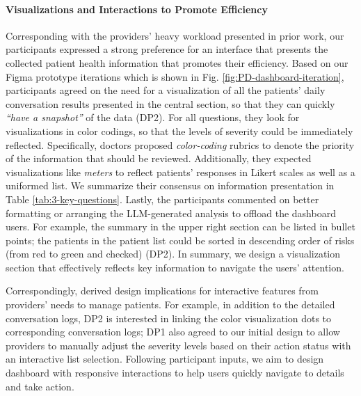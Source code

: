 \paragraph{Visualizations and Interactions to Promote Efficiency}
\label{3-PD-finding-efficiency}
Corresponding with the providers' heavy workload presented in prior work, our participants expressed a strong preference for an interface that presents the collected patient health information that promotes their efficiency. 
Based on our Figma prototype iterations which is shown in Fig. \ref{fig:PD-dashboard-iteration}, participants agreed on the need for a visualization of all the patients' daily conversation results presented in the central section, so that they can quickly \textit{``have a snapshot''} of the data (DP2). For all questions, they look for visualizations in color codings, so that the levels of severity could be immediately reflected. Specifically, doctors proposed \textit{color-coding }rubrics to denote the priority of the information that should be reviewed.
Additionally, they expected visualizations like \textit{meters} to reflect patients' responses in Likert scales as well as a uniformed list.  We summarize their consensus on information presentation in Table \ref{tab:3-key-questions}.
Lastly, the participants commented on better formatting or arranging the LLM-generated analysis to offload the dashboard users. For example, the summary in the upper right section can be listed in bullet points; the patients in the patient list could be sorted in descending order of risks (from red to green and checked) (DP2). In summary, we design a visualization section that effectively reflects key information to navigate the users' attention.

Correspondingly, derived design implications for interactive features from providers' needs to manage patients. For example, in addition to the detailed conversation logs, DP2 is interested in linking the color visualization dots to corresponding conversation logs; DP1 also agreed to our initial design to allow providers to manually adjust the severity levels based on their action status with an interactive list selection.
Following participant inputs, we aim to design \projectname{} dashboard with responsive interactions to help users quickly navigate to details and take action.


